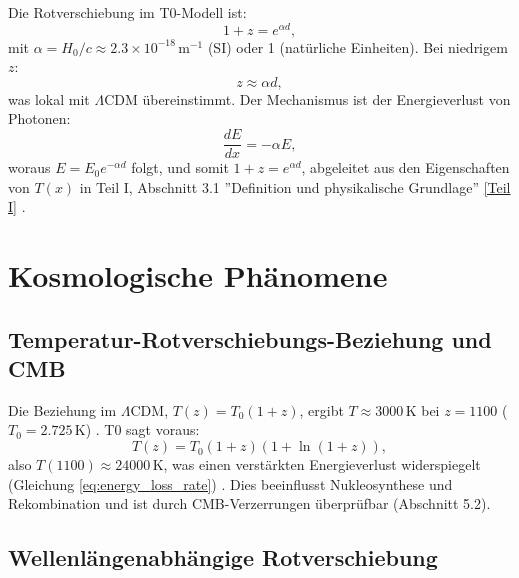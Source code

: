 \documentclass[12pt,a4paper]{article}
\newcommand{\Tfield}{T(x)}
\begin{document}
	Die Rotverschiebung im T0-Modell ist:
	\begin{equation}
		1 + z = e^{\alpha d},
		\label{eq:redshift_distance}
	\end{equation}
	mit \(\alpha = H_0 / c \approx 2.3 \times 10^{-18} \, \text{m}^{-1}\) (SI) oder 1 (natürliche Einheiten). Bei niedrigem \(z\):
	\begin{equation}
		z \approx \alpha d,
		\label{eq:hubble_approx}
	\end{equation}
	was lokal mit \(\Lambda\)CDM übereinstimmt. Der Mechanismus ist der Energieverlust von Photonen:
	\begin{equation}
		\frac{dE}{dx} = -\alpha E,
		\label{eq:energy_loss_rate}
	\end{equation}
	woraus \(E = E_0 e^{-\alpha d}\) folgt, und somit \(1 + z = e^{\alpha d}\), abgeleitet aus den Eigenschaften von \(\Tfield\) in Teil I, Abschnitt 3.1 ''Definition und physikalische Grundlage'' \href{https://github.com/jpascher/T0-Time-Mass-Duality/tree/main/2/pdf/Deutsch/QMRelTimeMassPart1.pdf}{[Teil I]} \cite{pascher_messdifferenzen_2025}.
	
	\section{Kosmologische Phänomene}
	\label{sec:cosmological_phenomena}
	
	\subsection{Temperatur-Rotverschiebungs-Beziehung und CMB}
	\label{subsec:cmb_temp}
	
	Die Beziehung im \(\Lambda\)CDM, \(T(z) = T_0 (1 + z)\), ergibt \(T \approx 3000 \, \text{K}\) bei \(z = 1100\) (\(T_0 = 2.725 \, \text{K}\)) \cite{Fixsen2009}. T0 sagt voraus:
	\begin{equation}
		T(z) = T_0 (1 + z) (1 + \ln(1 + z)),
		\label{eq:temperature_redshift_simplified}
	\end{equation}
	also \(T(1100) \approx 24000 \, \text{K}\), was einen verstärkten Energieverlust widerspiegelt (Gleichung \ref{eq:energy_loss_rate}) \cite{pascher_temp_2025}. Dies beeinflusst Nukleosynthese und Rekombination und ist durch CMB-Verzerrungen überprüfbar (Abschnitt 5.2).
	
	\subsection{Wellenlängenabhängige Rotverschiebung}
	\label{subsec:wavelength_redshift}
	
\end{document}
